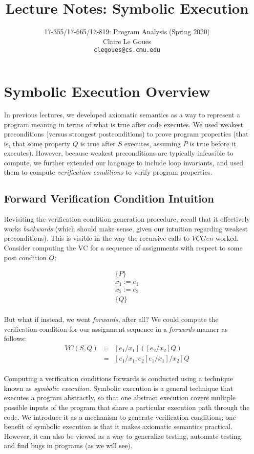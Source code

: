 \documentclass[11pt]{article}
\title{Lecture Notes: Symbolic Execution}
\author{17-355/17-665/17-819: Program Analysis (Spring 2020)\\
        Claire Le Goues\\
		{\tt clegoues@cs.cmu.edu}}
\date{}
\begin{document}
\maketitle

\section{Symbolic Execution Overview}

In previous lectures, we developed axiomatic semantics as a way to represent a
program meaning in terms of what is true after code executes. We used weakest
preconditions (versus strongest postconditions) to prove program properties
(that is, that some property $Q$ is true after $S$ executes, assuming $P$ is
true before it executes). However, because weakest preconditions are typically
infeasible to compute, we further extended our language to include loop
invariants, and used them to compute \emph{verification conditions} to verify
program properties. 

\subsection{Forward Verification Condition Intuition}

Revisiting the verification condition generation procedure, recall that it
effectively works \emph{backwards} (which should make sense, given our intuition
regarding weakest preconditions). This is visible in the way the recursive
calls to $VCGen$ worked. Consider computing the VC for a sequence of assignments
with respect to some post condition $Q$:

\[
\begin{array}{l}
\{ P \} \\
x_1 := e_1 \\
x_2 := e_2 \\
\{ Q \} \\
\end{array}
\]

But what if instead, we went \emph{forwards}, after all?
%
We could compute the verification condition for our assignment sequence in a
\emph{forwards} manner as follows:
\[
\begin{array}{lll}
VC(S, Q) & = & [ e_1 / x_1] ([e_2 / x_2] Q) \\
         & = & [ e_1 / x_1, e_2 [ e_1 / x_1 ] / x_2 ] Q \\
\end{array}
\]

Computing a verification conditions forwards is conducted using a technique
known as \emph{symbolic execution.} Symbolic execution is a general technique
that executes a program abstractly, so that one abstract execution covers
multiple possible inputs of the program that share a particular execution path
through the code. We introduce it as a mechanism to generate verification
conditions; one benefit of symbolic execution is that it makes axiomatic
semantics practical. However, it can also be viewed as a way to generalize
testing, automate testing, and find bugs in programs (as we will see).
\end{document}
